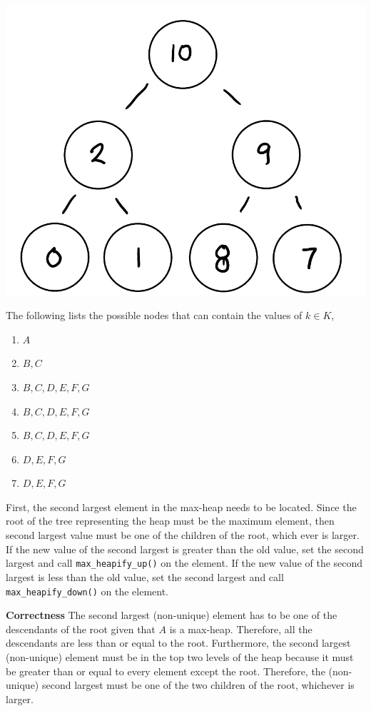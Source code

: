 \documentclass[12pt,twoside]{article}
\begin{document}
\begin{problems}
\begin{problemparts}
\begin{center}
        \includegraphics[scale=0.4]{Images/P1A5.PNG}
    \end{center}
\problempart The following lists the possible nodes that can contain the
values of $ k \in K $,
    \begin{enumerate}
        \item $ A $
        \item $ B, C $
        \item $ B, C, D, E, F, G $
        \item $ B, C, D, E, F, G $
        \item $ B, C, D, E, F, G $
        \item $ D, E, F, G $
        \item $ D, E, F, G $
    \end{enumerate}
 First, the second largest element in the
    max-heap needs to be located. Since the root of the tree representing the
    heap must be the maximum element, then second largest value must be one
    of the children of the root, which ever is larger. If the new value of
    the second largest is greater than the old value, set the second largest
    and call {\tt max\_heapify\_up()} on the element. If the new value of the
    second largest is less than the old value, set the second largest and
    call {\tt max\_heapify\_down()} on the element.

    \smallbreak

    {\bf Correctness} The second largest (non-unique) element has to be one
    of the descendants of the root given that $ A $ is a max-heap. Therefore,
    all the descendants are less than or equal to the root. Furthermore, the
    second largest (non-unique) element must be in the top two levels of the
    heap because it must be greater than or equal to every element except the
    root. Therefore, the (non-unique) second largest must be one of the two
    children of the root, whichever is larger.


\end{problemparts}
\end{problems}
\end{document}
